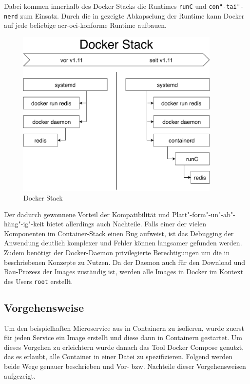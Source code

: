 Dabei kommen innerhalb des Docker Stacks die Runtimes \texttt{runC} und \texttt{con"-tai"-nerd} zum Einsatz. Durch die in  gezeigte Abkapselung der Runtime kann Docker auf jede beliebige \gls{acr-oci}-konforme Runtime aufbauen.

\begin{figure}[h]
	\begin{center}
		\includegraphics[width=0.9\textwidth]{bilder/docker-stack-containerd-runC.pdf}
		\caption{Docker Stack \citep{RktVsOtherProjects}}
		\label{fig:dockerStack}		
	\end{center}
\end{figure}

Der dadurch gewonnene Vorteil der Kompatibilität und Platt"-form"-un"-ab"-häng"-ig"-keit bietet allerdings auch Nachteile. Falls einer der vielen Komponenten im Container-Stack einen Bug aufweist, ist das Debugging der Anwendung deutlich komplexer und Fehler können langsamer gefunden werden. Zudem benötigt der Docker-Daemon privilegierte Berechtigungen um die in  beschriebenen Konzepte zu Nutzen. Da der Daemon auch für den Download und Bau-Prozess der Images zuständig ist, werden alle Images in Docker im Kontext des Users \texttt{root} erstellt.

\subsection{Vorgehensweise}
\label{sec:compDockerVorgehen}

Um den beispielhaften Microservice aus  in Containern zu isolieren, wurde zuerst für jeden Service ein Image erstellt und diese dann in Containern gestartet. Um dieses Vorgehen zu erleichtern wurde danach das Tool Docker Compose genutzt, das es erlaubt,  alle Container in einer Datei zu spezifizieren. Folgend werden beide Wege genauer beschrieben und Vor- bzw. Nachteile dieser Vorgehensweisen aufgezeigt.

